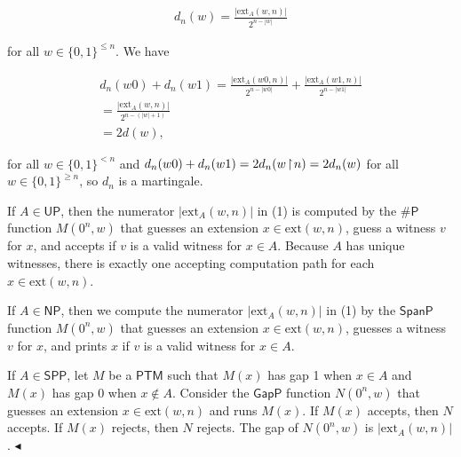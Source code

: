 \[\begin{gathered}
d_{n}(w)=\frac{|\mathrm{ext}_{A}(w,n)|}{2^{n-|w|}}
\end{gathered}\]


for all
$w\in\{0,1\}^{\leq n}.$
We have\par


\[\begin{gathered}
\displaystyle d_{n}(w0)+d_{n}(w1) \displaystyle= \displaystyle\frac{|\mathrm{ext}_{A}(w0,n)|}{2^{n-|w0|}}+\frac{|\mathrm{ext}_{A}(w1,n)|}{2^{n-|w1|}} \\
\displaystyle= \displaystyle\frac{|\mathrm{ext}_{A}(w,n)|}{2^{n-(|w|+1)}} \\
\displaystyle= \displaystyle 2d(w),
\end{gathered}\]


for all $w\in\{0,1\}^{<n}$ and $d_{n}(w0)+d_{n}(w1)=2d_{n}(w\negthinspace\upharpoonright\negthinspace n)=2d_{n}(w)$ for all $w\in\{0,1\}^{\geq n}$, so $d_{n}$ is a martingale.\par




If $A\in\mathsf{UP}$, then the numerator $|\mathrm{ext}_{A}(w,n)|$ in (1) is computed by the ${\mathsf{\#}\mathsf{P}}$ function $M(0^{n},w)$ that guesses an extension $x\in\mathrm{ext}(w,n)$, guess a witness $v$ for $x$, and accepts if $v$ is a valid witness for $x\in A$. Because $A$ has unique witnesses, there is exactly one accepting computation path for each $x\in\mathrm{ext}(w,n)$.\par




If $A\in\mathsf{NP}$, then we compute the numerator $|\mathrm{ext}_{A}(w,n)|$ in (1) by the $\mathsf{SpanP}$ function $M(0^{n},w)$ that guesses an extension $x\in\mathrm{ext}(w,n)$, guesses a witness $v$ for $x$, and prints $x$ if $v$ is a valid witness for $x\in A$.\par




If $A\in\mathsf{SPP}$, let $M$ be a $\mathsf{PTM}$ such that $M(x)$ has gap 1 when $x\in A$ and $M(x)$ has gap 0 when $x\not\in A$.
Consider the $\mathsf{GapP}$ function $N(0^{n},w)$ that guesses an extension $x\in\mathrm{ext}(w,n)$ and runs $M(x)$. If $M(x)$ accepts, then $N$ accepts. If $M(x)$ rejects, then $N$ rejects. The gap of $N(0^{n},w)$ is $|\mathrm{ext}_{A}(w,n)|$.
$\blacktriangleleft$\par






